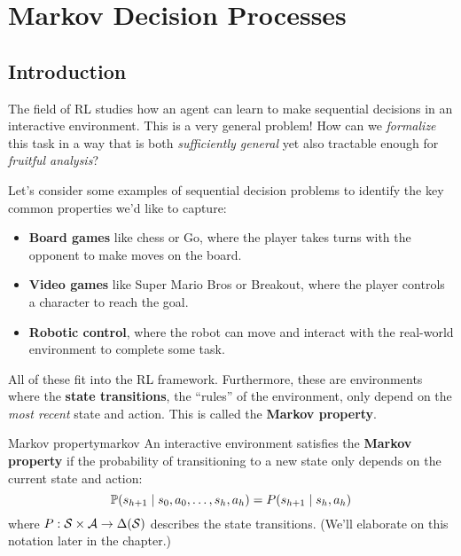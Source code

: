 \documentclass[\main/main]{subfiles}
\begin{document}
\chapter{Markov Decision Processes}
\label{ch:2_mdps}

\tableofcontents

\newpage
\section{Introduction}

The field of RL studies how an agent can learn to make sequential decisions in an interactive environment. This is a very general problem! How can we \emph{formalize} this task in a way that is both \emph{sufficiently general} yet also tractable enough for \emph{fruitful analysis}?

Let's consider some examples of sequential decision problems to identify the key common properties we'd like to capture:

\begin{itemize}
    \item \textbf{Board games} like chess or Go, where the player takes turns with the opponent to make moves on the board.
    \item \textbf{Video games} like Super Mario Bros or Breakout, where the player controls a character to reach the goal.
    \item \textbf{Robotic control}, where the robot can move and interact with the real-world environment to complete some task.
\end{itemize}



All of these fit into the RL framework. Furthermore, these are environments where the \textbf{state transitions}, the ``rules'' of the environment, only depend on the \emph{most recent} state and action. This is called the \textbf{Markov property}.

\begin{definition}{Markov property}{markov}
    An interactive environment satisfies the \textbf{Markov property} if the probability of transitioning to a new state only depends on the current state and action:
    \[
        \P(s_{h+1} \mid s_0, a_0, \dots, s_h, a_h) = P(s_{h+1} \mid s_h, a_h)
    \]
    where $P : \S \times \A \to \Delta(\S)$ describes the state transitions. (We'll elaborate on this notation later in the chapter.)
\end{definition}
\end{document}
